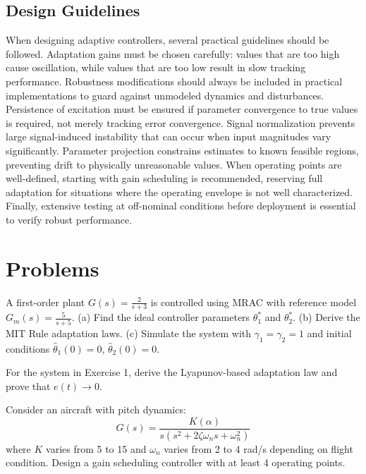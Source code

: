 \subsection{Design Guidelines}

When designing adaptive controllers, several practical guidelines should be followed. Adaptation gains must be chosen carefully: values that are too high cause oscillation, while values that are too low result in slow tracking performance. Robustness modifications should always be included in practical implementations to guard against unmodeled dynamics and disturbances. Persistence of excitation must be ensured if parameter convergence to true values is required, not merely tracking error convergence. Signal normalization prevents large signal-induced instability that can occur when input magnitudes vary significantly. Parameter projection constrains estimates to known feasible regions, preventing drift to physically unreasonable values. When operating points are well-defined, starting with gain scheduling is recommended, reserving full adaptation for situations where the operating envelope is not well characterized. Finally, extensive testing at off-nominal conditions before deployment is essential to verify robust performance.

\newpage
\section{Problems}
\label{sec:adaptive_problems}

\begin{exercise}
A first-order plant $G(s) = \frac{2}{s+3}$ is controlled using MRAC with reference model $G_m(s) = \frac{5}{s+5}$. (a) Find the ideal controller parameters $\theta_1^*$ and $\theta_2^*$. (b) Derive the MIT Rule adaptation laws. (c) Simulate the system with $\gamma_1 = \gamma_2 = 1$ and initial conditions $\hat{\theta}_1(0) = 0$, $\hat{\theta}_2(0) = 0$.
\end{exercise}

\begin{exercise}
For the system in Exercise 1, derive the Lyapunov-based adaptation law and prove that $e(t) \to 0$.
\end{exercise}

\begin{exercise}
Consider an aircraft with pitch dynamics:
\begin{equation}
G(s) = \frac{K(\alpha)}{s(s^2 + 2\zeta\omega_n s + \omega_n^2)}
\end{equation}
where $K$ varies from 5 to 15 and $\omega_n$ varies from 2 to 4 rad/s depending on flight condition. Design a gain scheduling controller with at least 4 operating points.
\end{exercise}

